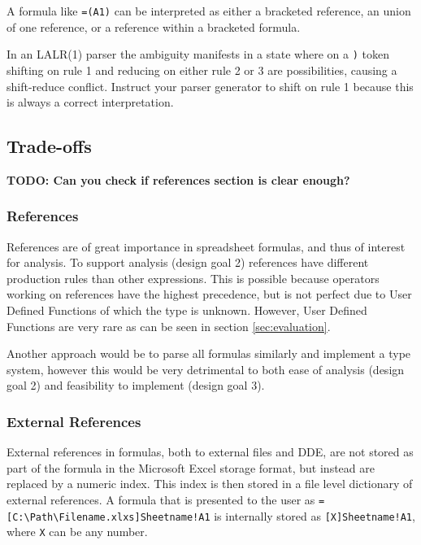 \documentclass[conference]{IEEEtran}
\newcommand{\todo}[1]{\textbf{TODO: #1}}
\begin{document}
A formula like \texttt{=(A1)} can be interpreted as either a bracketed reference, an union of one reference, or a reference within a bracketed formula.

In an LALR(1) parser the ambiguity manifests in a state where on a \texttt{)} token shifting on rule 1 and reducing on either rule 2 or 3 are possibilities, causing a shift-reduce conflict.
Instruct your parser generator to shift on rule 1 because this is always a correct interpretation.

\subsection{Trade-offs}

\todo{Can you check if references section is clear enough?}

\subsubsection{\textbf{References}}
\label{tradeoff:references}

References are of great importance in spreadsheet formulas, and thus of interest for analysis.
To support analysis (design goal 2) references have different production rules than other expressions.
This is possible because operators working on references have the highest precedence, but is not perfect due to User Defined Functions of which the type is unknown.
However, User Defined Functions are very rare as can be seen in section \ref{sec:evaluation}.

Another approach would be to parse all formulas similarly and implement a type system, however this would be very detrimental to both ease of analysis (design goal 2) and feasibility to implement (design goal 3).

\subsubsection{\textbf{External References}}

External references in formulas, both to external files and DDE, are not stored as part of the formula in the Microsoft Excel storage format, but instead are replaced by a numeric index.
This index is then stored in a file level dictionary of external references.
A formula that is presented to the user as \texttt{=[C:\textbackslash Path\textbackslash Filename.xlxs]Sheetname!A1} is internally stored as \texttt{[X]Sheetname!A1}, where \texttt{X} can be any number.
\end{document}
